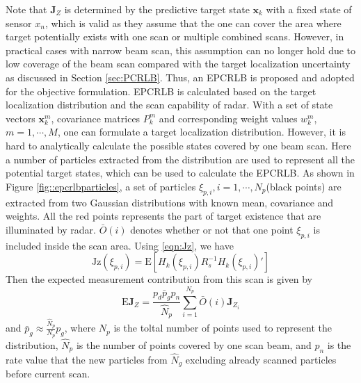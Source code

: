 \documentclass[12pt,journal,draftclsnofoot,onecolumn]{IEEEtran}
\begin{document}
Note that $\mathbf{J}_Z$ is determined by the predictive target state $\mathbf{x}_k$ with a fixed state of sensor $x_n$, which is valid as they assume that the one can cover the area where target potentially exists with one scan or multiple combined scans\cite{song2010target}. However, in practical cases with narrow beam scan, this assumption can no longer hold due to low coverage of the beam scan compared with the target localization uncertainty as discussed in Section \ref{sec:PCRLB}. Thus, an {EPCRLB} is proposed and adopted for the objective formulation. {EPCRLB} is calculated based on the target localization distribution and the scan capability of radar. With a set of state vectors $\mathbf{x}^m_k$, covariance matrices $P^m_k$ and corresponding weight values $w^m_k$, $m=1,\cdots,M$, one can formulate a target localization distribution. However, it is hard to analytically calculate the possible states covered by one beam scan. Here a number of particles extracted from the distribution are used to represent all the potential target states, which can be used to calculate the {EPCRLB}. As shown in Figure \ref{fig::epcrlbparticles}, a set of particles ${\xi_{p,i}}, i=1,\cdots, N_p$(black points) are extracted from two Gaussian distributions with known mean, covariance and weights. All the red points represents the part of target existence that are illuminated by radar. $\bar O(i)$ denotes whether or not that one point $\xi_{p,i}$ is included inside the scan area. Using \ref{eqn:Jz}, we have 
\begin{equation}
	\text{Jz}(\xi_{p,i}) = \text{E}[H_k(\xi_{p,i})R_s^{-1}H_k(\xi_{p,i})']
\end{equation}
Then the expected measurement contribution from this scan is given by 
\begin{equation}
	\text{E}\mathbf{J}_Z = \frac{p_d\bar{p}_gp_n}{\hat{N}_p}\sum_{i=1}^{N_p}\bar{O}(i)\mathbf{J}_{Z_i} 
\end{equation}
and $\bar{p}_g\approx \frac{\hat{N}_p}{N_p}p_g$, where $N_p$ is the toltal number of points used to represent the distribution, $\hat N_p$ is the number of points covered by one scan beam, and $p_n$ is the rate value that the new particles from $\hat{N}_g$ excluding already scanned particles before current scan. 
\end{document}
